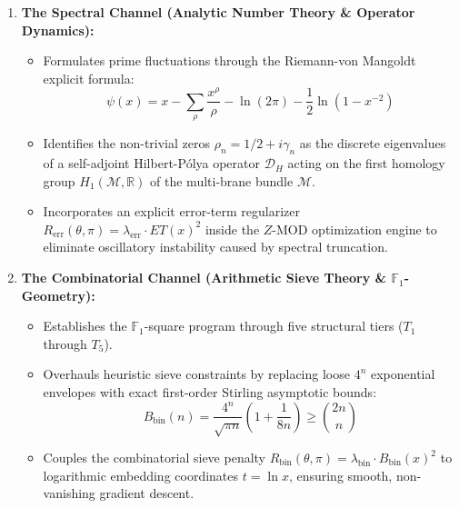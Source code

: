 \documentclass[11pt,a4paper]{article}
\theoremstyle{definition}
\theoremstyle{remark}
\begin{document}
\begin{enumerate}
    \item \textbf{The Spectral Channel (Analytic Number Theory \& Operator Dynamics):}
    \begin{itemize}
        \item Formulates prime fluctuations through the Riemann-von Mangoldt explicit formula:
        \begin{equation}
        \psi(x) = x - \sum_{\rho} \frac{x^\rho}{\rho} - \ln(2\pi) - \frac{1}{2}\ln(1 - x^{-2})
        \end{equation}
        \item Identifies the non-trivial zeros $\rho_n = 1/2 + i\gamma_n$ as the discrete eigenvalues of a self-adjoint Hilbert-P\'olya operator $\mathcal{D}_H$ acting on the first homology group $H_1(\mathcal{M}, \mathbb{R})$ of the multi-brane bundle $\mathcal{M}$.
        \item Incorporates an explicit error-term regularizer $R_{\mathrm{err}}(\theta, \pi) = \lambda_{\mathrm{err}} \cdot ET(x)^2$ inside the $Z\text{-MOD}$ optimization engine to eliminate oscillatory instability caused by spectral truncation.
    \end{itemize}

    \item \textbf{The Combinatorial Channel (Arithmetic Sieve Theory \& $\mathbb{F}_1$-Geometry):}
    \begin{itemize}
        \item Establishes the $\mathbb{F}_1$-square program through five structural tiers ($T_1$ through $T_5$).
        \item Overhauls heuristic sieve constraints by replacing loose $4^n$ exponential envelopes with exact first-order Stirling asymptotic bounds:
        \begin{equation}
        B_{\mathrm{bin}}(n) = \frac{4^n}{\sqrt{\pi n}}\left(1 + \frac{1}{8n}\right) \ge \binom{2n}{n}
        \end{equation}
        \item Couples the combinatorial sieve penalty $R_{\mathrm{bin}}(\theta, \pi) = \lambda_{\mathrm{bin}} \cdot B_{\mathrm{bin}}(x)^2$ to logarithmic embedding coordinates $t = \ln x$, ensuring smooth, non-vanishing gradient descent.
    \end{itemize}
\end{enumerate}
\end{document}
